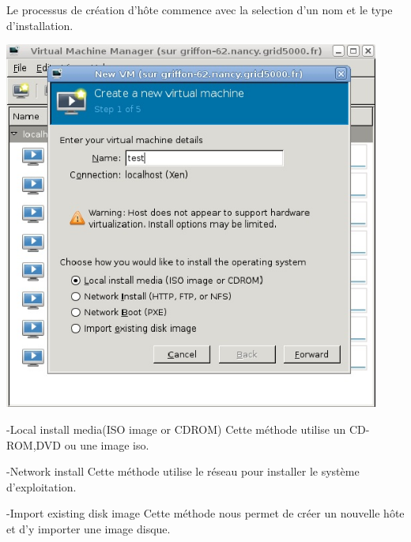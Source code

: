 Le processus de création d'hôte commence avec la selection d'un nom et le type d'installation.
\begin{center}
\includegraphics[width=350pt]{images/nommachine.jpg}
\end{center}
-Local install media(ISO image or CDROM)
Cette méthode utilise un CD-ROM,DVD ou une image iso.

-Network install
Cette méthode utilise le réseau pour installer le système d'exploitation.

-Import existing disk image
Cette méthode nous permet de créer un nouvelle hôte et d'y importer une image disque.

